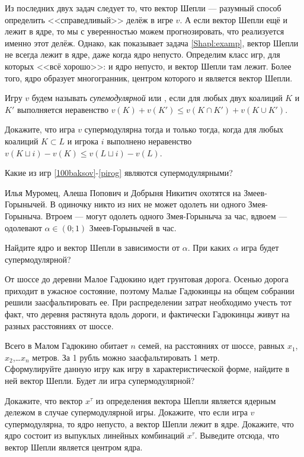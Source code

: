 \documentclass[a4paper,12pt]{article}
\begin{document}
Из последних двух задач следует то, что вектор Шепли --- разумный способ определить <<справедливый>> делёж в игре $v$. А если вектор Шепли ещё и лежит в ядре, то мы с уверенностью можем прогнозировать, что реализуется именно этот делёж. Однако, как показывает задача \ref{Shapl:examp}, вектор Шепли не всегда лежит в ядре, даже когда ядро непусто. Определим класс игр, для которых <<всё хорошо>>: и ядро непусто, и вектор Шепли там лежит. Более того, ядро образует многогранник, центром которого и является вектор Шепли.


Игру $v$ будем называть \textit{супемодулярной} или , если для любых двух коалиций $K$ и $K'$ выполняется неравенство $v(K)+v(K') \leq v(K\cap K') + v(K \cup K')$.

 Докажите, что игра $v$ супермодулярна тогда и только тогда, когда для любых коалиций $K \subset L$ и игрока $i$ выполнено неравенство $v(K\sqcup {i}) - v(K) \leq v(L \sqcup {i})-v(L)$.

 Какие из игр \ref{100baksov}-\ref{pirog} являются супермодулярными?


 Илья Муромец, Алеша Попович и Добрыня Никитич охотятся на Змеев-Горынычей. В одиночку никто из них не может одолеть ни одного Змея-Горыныча. Втроем --- могут одолеть одного Змея-Горыныча за час, вдвоем --- одолевают $\alpha\in (0;1)$ Змеев-Горынычей в час.

 Найдите ядро и вектор Шепли в зависимости от $\alpha$.
 При каких $\alpha$ игра будет супермодулярной?

 От шоссе до деревни Малое Гадюкино идет грунтовая дорога. Осенью дорога приходит в ужасное состояние, поэтому Малые Гадюкинцы на общем собрании решили заасфальтировать ее. При распределении затрат необходимо учесть тот факт, что деревня растянута вдоль дороги, и фактически Гадюкинцы живут на разных расстояниях от шоссе.

Всего в Малом Гадюкино обитает  $n$  семей, на расстояниях от шоссе, равных  $x_{1}$,  $x_{2}$,\ldots  $x_{n}$ метров. За 1 рубль можно заасфальтировать 1 метр.
\\ Сформулируйте данную игру как игру в характеристической форме, найдите в ней вектор Шепли.
 Будет ли игра супермодулярной?



  Докажите, что вектор $x^\tau$ из определения вектора Шепли является ядерным дележом в случае супермодулярной игры.
 Докажите, что если игра $v$ супермодулярна, то ядро непусто, а вектор Шепли лежит в ядре.
 Докажите, что ядро состоит из выпуклых линейных комбинаций $x^\tau$. Выведите отсюда, что вектор Шепли является центром ядра.

\end{document}
